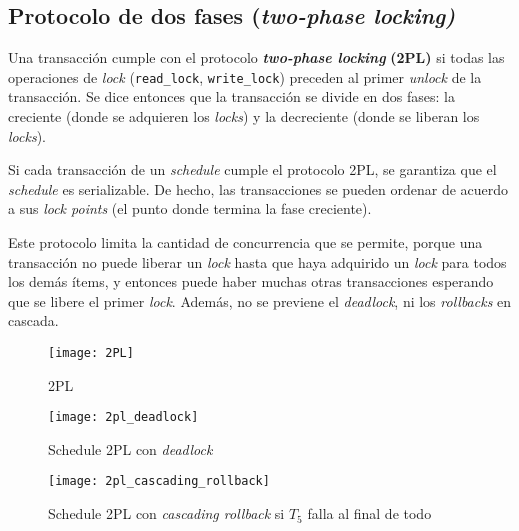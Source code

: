 \documentclass[a4paper, twoside]{article}
\begin{document}
\subsection{Protocolo de dos fases (\emph{two-phase locking)}}

Una transacción cumple con el protocolo \textbf{\emph{two-phase locking}}\textbf{
(2PL)} si todas las operaciones de \emph{lock} (\texttt{read\_lock},
\texttt{write\_lock}) preceden al primer \emph{unlock} de la transacción.
Se dice entonces que la transacción se divide en dos fases: la creciente
(donde se adquieren los \emph{locks}) y la decreciente (donde se liberan
los \emph{locks}).

Si cada transacción de un \emph{schedule} cumple el protocolo 2PL,
se garantiza que el \emph{schedule} es serializable. De hecho, las
transacciones se pueden ordenar de acuerdo a sus \emph{lock points}
(el punto donde termina la fase creciente).

Este protocolo limita la cantidad de concurrencia que se permite,
porque una transacción no puede liberar un \emph{lock} hasta que haya
adquirido un \emph{lock} para todos los demás ítems, y entonces puede
haber muchas otras transacciones esperando que se libere el primer
\emph{lock}. Además, no se previene el \emph{deadlock}, ni los \emph{rollbacks}
en cascada.

\begin{figure}[H]
\noindent \begin{centering}
\texttt{[image: 2PL]}
\par\end{centering}

\protect\caption{2PL}


\end{figure}
\begin{figure}[H]
\noindent \begin{centering}
\texttt{[image: 2pl\_deadlock]}
\par\end{centering}

\protect\caption{Schedule 2PL con \emph{deadlock}}
\end{figure}
\begin{figure}[H]
\noindent \begin{centering}
\texttt{[image: 2pl\_cascading\_rollback]}
\par\end{centering}

\protect\caption{Schedule 2PL con \emph{cascading rollback }si $T_{5}$ falla al final
de todo}
\end{figure}
\end{document}
